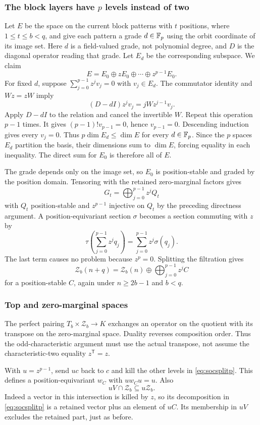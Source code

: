 \documentclass[11pt,a4paper]{article}
\theoremstyle{definition}\newtheorem{definition}[theorem]{Definition}
\theoremstyle{remark}\newtheorem{remark}[theorem]{Remark}
\begin{document}
\subsubsection{The block layers have \texorpdfstring{$p$}{p} levels instead of two}
Let $E$ be the space on the current block patterns with $t$ positions, where $1\le t\le b<q$, and give each pattern a grade $d\in\mathbb F_p$ using the orbit coordinate of its image set. Here $d$ is a field-valued grade, not polynomial degree, and $D$ is the diagonal operator reading that grade. Let $E_d$ be the corresponding subspace. We claim
\[E=E_0\oplus zE_0\oplus\cdots\oplus z^{p-1}E_0.
\]
For fixed $d$, suppose $\sum_{j=0}^{p-1}z^jv_j=0$ with $v_j\in E_d$. The commutator identity and $Wz=zW$ imply
\[(D-dI)z^jv_j=jWz^{j-1}v_j.
\]
Apply $D-dI$ to the relation and cancel the invertible $W$. Repeat this operation $p-1$ times. It gives $(p-1)!v_{p-1}=0$, hence $v_{p-1}=0$. Descending induction gives every $v_j=0$. Thus $p\dim E_d\le\dim E$ for every $d\in\mathbb F_p$. Since the $p$ spaces $E_d$ partition the basis, their dimensions sum to $\dim E$, forcing equality in each inequality. The direct sum for $E_0$ is therefore all of $E$.

The grade depends only on the image set, so $E_0$ is position-stable and graded by the position domain. Tensoring with the retained zero-marginal factors gives
\[G_t=\bigoplus_{j=0}^{p-1}z^jQ_t
\]
with $Q_t$ position-stable and $z^{p-1}$ injective on $Q_t$ by the preceding directness argument. A position-equivariant section $\sigma$ becomes a section commuting with $z$ by
\[\tau\left(\sum_{j=0}^{p-1}z^jq_j\right)=\sum_{j=0}^{p-1}z^j\sigma(q_j).
\]
The last term causes no problem because $z^p=0$. Splitting the filtration gives
\begin{equation}\label{eq:socsplitp}
\mathcal Z_b(n+q)=\mathcal Z_b(n)\oplus\bigoplus_{j=0}^{p-1}z^jC
\end{equation}
for a position-stable $C$, again under $n\ge2b-1$ and $b<q$.

\subsubsection{Top and zero-marginal spaces}
The perfect pairing $T_b\times\mathcal Z_b\to K$ exchanges an
operator on the quotient with its transpose on the zero-marginal
space. Duality reverses composition order. Thus the odd-characteristic
argument must use the actual transpose, not assume the
characteristic-two equality $z^{\mathsf T}=z$.

With $u=z^{p-1}$, send $uc$ back to $c$ and kill the other levels in \eqref{eq:socsplitp}. This defines a position-equivariant $w_C$ with $uw_Cu=u$. Also
\[uV\cap \mathcal Z_b\subseteq u\mathcal Z_b.
\]
Indeed a vector in this intersection is killed by $z$, so its decomposition in \eqref{eq:socsplitp} is a retained vector plus an element of $uC$. Its membership in $uV$ excludes the retained part, just as before.
\end{document}
